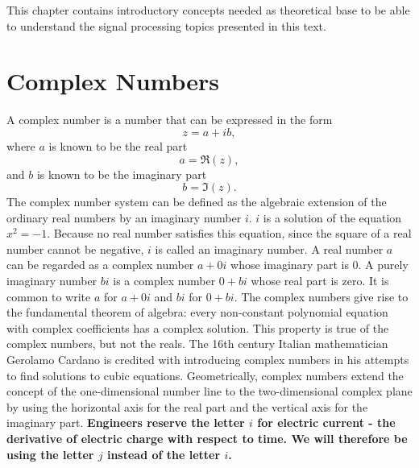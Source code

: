 \documentclass[12pt,oneside,openany]{memoir}
\numberwithin{equation}{subsection}
\begin{document}
This chapter contains introductory concepts needed as theoretical base to be able to understand the signal processing topics presented in this text.


\section{Complex Numbers}
A complex number is a number that can be expressed in the form
\[z = a + ib,\]
where \(a\) is known to be the real part
\[a = \Re(z),\]
and \(b\) is known to be the imaginary part
\[b = \Im(z).\]
The complex number system can be defined as the algebraic extension of the ordinary real numbers by an imaginary number \(i\). \(i\) is a solution of the equation \(x^2 = −1\). Because no real number satisfies this equation, since the square of a real number cannot be negative, \(i\) is called an imaginary number.
\bigbreak
A real number \(a\) can be regarded as a complex number \(a + 0i\) whose imaginary part is \(0\). A purely imaginary number \(bi\) is a complex number \(0 + bi\) whose real part is zero. It is common to write \(a\) for \(a + 0i\) and \(bi\) for \(0 + bi\).
\bigbreak
The complex numbers give rise to the fundamental theorem of algebra: every non-constant polynomial equation with complex coefficients has a complex solution. This property is true of the complex numbers, but not the reals. The 16th century Italian mathematician Gerolamo Cardano is credited with introducing complex numbers in his attempts to find solutions to cubic equations.
\bigbreak
Geometrically, complex numbers extend the concept of the one-dimensional number line to the two-dimensional complex plane by using the horizontal axis for the real part and the vertical axis for the imaginary part.
\bigbreak
\textbf{Engineers reserve the letter \(i\) for electric current - the derivative of electric charge with respect to time. We will therefore be using the letter \(j\) instead of the letter \(i\).}
\end{document}
